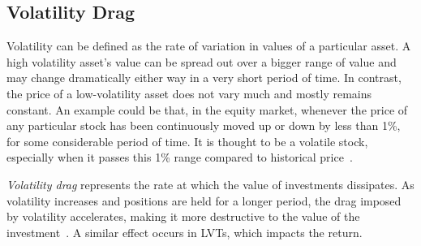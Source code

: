 \subsection{Volatility Drag}\label{appx:voldrag}
Volatility can be defined as the rate of variation in values of a particular asset. A high volatility asset's value can be spread out over a bigger range of value and may change dramatically either way in a very short period of time. In contrast, the price of a low-volatility asset does not vary much and mostly remains constant. An example could be that, in the equity market, whenever the price of any particular stock has been continuously moved up or down by less than 1\%, for some considerable period of time. It is thought to be a volatile stock, especially when it passes this 1\% range compared to historical price~\cite{Investo_Volatility}.

\textsl{Volatility drag} represents the rate at which the value of investments dissipates. As volatility increases and positions are held for a longer period, the drag imposed by volatility accelerates, making it more destructive to the  value of the investment~\cite{tsalikis2019can,SeekingAlpha_Volatility}. A similar effect occurs in LVTs, which impacts the return.


